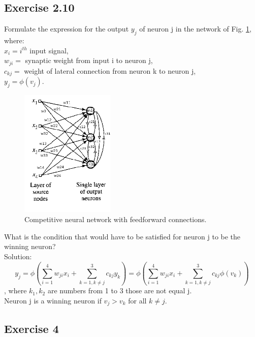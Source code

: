 \documentclass[a4paper, 12pt]{article}
\begin{document}
\subsection{Exercise 2.10}

Formulate the expression for the output $y_j$ of neuron j in the network of Fig. \ref{fig:competiotionNN}, where:\\

$x_i = i^{th}$ input signal,\\
$w_{ji} = $ synaptic weight from input i to neuron j,\\
$c_{kj} = $ weight of lateral connection from neuron k to neuron j,\\
$y_j = \phi(v_j)$.\\



\begin{figure}[h]
  \centering
  \caption{Competitive neural network with feedforward connections.\label{fig:competiotionNN}}
  \includegraphics[width=0.4\textwidth]{competiotionNN}
\end{figure}

What is the condition that would have to be satisfied for neuron j to be the winning neuron?\\

Solution:\\

$$y_j = \phi(\sum_{i=1}^{4} w_{ji}x_i  + \sum_{k=1, k \neq j}^{3} c_{kj}y_k) = \phi(\sum_{i=1}^{4} w_{ji}x_i + \sum_{k=1, k \neq j}^{3} c_{kj}\phi(v_k))$$, where $k_1, k_2$ are numbers from 1 to 3 those are not equal j.\\

Neuron j is a winning neuron if $v_j > v_k$ for all $k \neq j$.

\subsection{Exercise 4}
\end{document}
